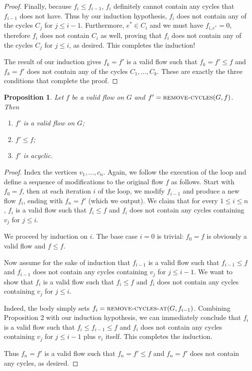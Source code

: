 \documentclass[10pt]{article}
\newtheorem{proposition}[lemma]{Proposition}
\begin{document}
\begin{proof}
  Finally, because \(f_{i} \leq f_{i - 1}\), \(f_i\) definitely cannot contain any cycles that \(f_{i - 1}\) does not have. Thus by our induction hypothesis, \(f_i\) does not contain any of the cycles \(C_j\) for \(j \leq i - 1\). Furthermore, \(e^* \in C_i\) and we must have \(f_{i, e^*} = 0\), therefore \(f_i\) does not contain \(C_i\) as well, proving that \(f_i\) does not contain any of the cycles \(C_j\) for \(j \leq i\), as desired. This completes the induction!

  The result of our induction gives \(f_k = f'\) is a valid flow such that \(f_k = f' \leq f\) and \(f_k = f'\) does not contain any of the cycles \(C_1, \ldots, C_k\). These are exactly the three conditions that complete the proof.
\end{proof}

\begin{proposition}
  Let \(f\) be a valid flow on \(G\) and \(f' = \textsc{remove-cycles}(G, f)\). Then 
  \begin{enumerate}
    \item \(f'\) is a valid flow on \(G\);
    \item \(f' \le f\);
    \item \(f'\) is acyclic.
  \end{enumerate}
\end{proposition}

\begin{proof}
  Index the vertices \(v_1, \ldots, c_n\). Again, we follow the execution of the loop and define a sequence of modifications to the original flow \(f\) as follows. Start with \(f_0 = f\), then at each iteration \(i\) of the loop, we modify \(f_{i - 1}\) and produce a new flow \(f_i\), ending with \(f_n = f'\) (which we output). We claim that for every \(1 \leq i \leq n\), \(f_i\) is a valid flow such that \(f_i \leq f\) and \(f_i\) does not contain any cycles containing \(v_j\) for \(j \leq i\).

  We proceed by induction on \(i\). The base case \(i = 0\) is trivial: \(f_0 = f\) is obviously a valid flow and \(f \leq f\).

  Now assume for the sake of induction that \(f_{i - 1}\) is a valid flow such that \(f_{i - 1} \leq f\) and \(f_{i - 1}\) does not contain any cycles containing \(v_j\) for \(j \leq i - 1\). We want to show that \(f_i\) is a valid flow such that \(f_i \leq f\) and \(f_i\) does not contain any cycles containing \(v_j\) for \(j \leq i\). 
  
  Indeed, the body simply sets \(f_i = \textsc{remove-cycles-at}(G, f_{i - 1})\). Combining Proposition 2 with our induction hypothesis, we can immediately conclude that \(f_i\) is a valid flow such that \(f_i \leq f_{i - 1} \leq f\) and \(f_i\) does not contain any cycles containing \(v_j\) for \(j \leq i - 1\) plus \(v_i\) itself. This completes the induction.

  Thus \(f_n = f'\) is a valid flow such that \(f_n = f' \leq f\) and \(f_n = f'\) does not contain any cycles, as desired.
\end{proof}
\end{document}
